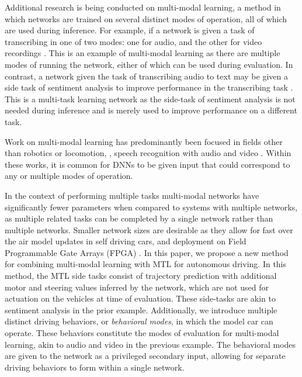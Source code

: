 Additional research is being conducted on multi-modal learning, a method in which networks are trained on several distinct modes of operation, all of which are used during inference. For example, if a network is given a task of transcribing in one of two modes: one for audio, and the other for video recordings \cite{ngiam2011multimodal}. This is an example of multi-modal learning as there are multiple modes of running the network, either of which can be used during evaluation. In contrast, a network given the task of transcribing audio to text may be given a side task of sentiment analysis to improve performance in the transcribing task \cite{6639012}. This is a multi-task learning network as the side-task of sentiment analysis is not needed during inference and is merely used to improve performance on a different task.



Work on multi-modal learning has predominantly been focused in fields other than robotics or locomotion, \eg, speech recognition with audio and video \cite{ngiam2011multimodal, 6639012, rosas2013multimodal}. Within these works, it is common for DNNs to be given input that could correspond to any or multiple modes of operation. 

In the context of performing multiple tasks multi-modal networks have significantly fewer parameters when compared to systems with multiple networks, as multiple related tasks can be completed by a single network rather than multiple networks. Smaller network sizes are desirable as they allow for fast over the air model updates in self driving cars, and deployment on Field Programmable Gate Arrays (FPGA) \cite{DBLP:journals/corr/IandolaMAHDK16}.
In this paper, we propose a new method for combining multi-modal learning with MTL for autonomous driving.
In this method, the MTL side tasks consist of trajectory prediction with additional motor and steering values inferred by the network, which are not used for actuation on the vehicles at time of evaluation. These side-tasks are akin to sentiment analysis in the prior example.
Additionally, we introduce multiple distinct driving behaviors, or \textit{behavioral modes}, in which the model car can operate.
These behaviors constitute the modes of evaluation for multi-modal learning, akin to audio and video in the previous example.
The behavioral modes are given to the network as a privileged secondary input, allowing for separate driving behaviors to form within a single network.

